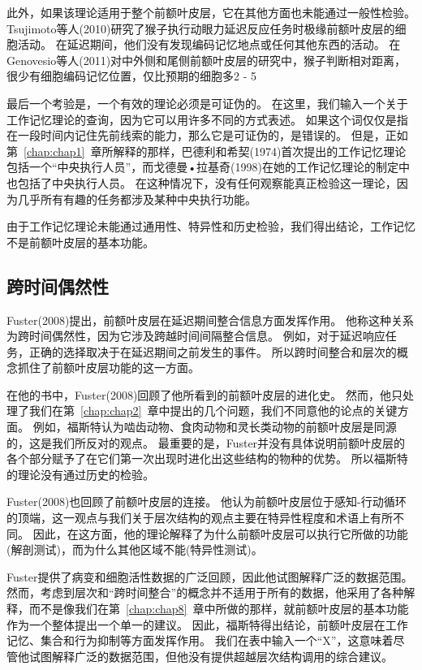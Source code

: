 此外，如果该理论适用于整个前额叶皮层，它在其他方面也未能通过一般性检验。
Tsujimoto等人(2010)研究了猴子执行动眼力延迟反应任务时极缘前额叶皮层的细胞活动。
在延迟期间，他们没有发现编码记忆地点或任何其他东西的活动。
在Genovesio等人(2011)对中外侧和尾侧前额叶皮层的研究中，猴子判断相对距离，很少有细胞编码记忆位置，仅比预期的细胞多2 - 5%
\par


最后一个考验是，一个有效的理论必须是可证伪的。
在这里，我们输入一个关于工作记忆理论的查询，因为它可以用许多不同的方式表述。
如果这个词仅仅是指在一段时间内记住先前线索的能力，那么它是可证伪的，是错误的。
但是，正如第~\ref{chap:chap1}~章所解释的那样，巴德利和希契(1974)首次提出的工作记忆理论包括一个“中央执行人员”，而戈德曼•拉基奇(1998)在她的工作记忆理论的制定中也包括了中央执行人员。
在这种情况下，没有任何观察能真正检验这一理论，因为几乎所有有趣的任务都涉及某种中央执行功能。
\par


由于工作记忆理论未能通过通用性、特异性和历史检验，我们得出结论，工作记忆不是前额叶皮层的基本功能。



\subsection{跨时间偶然性}

Fuster(2008)提出，前额叶皮层在延迟期间整合信息方面发挥作用。
他称这种关系为跨时间偶然性，因为它涉及跨越时间间隔整合信息。
例如，对于延迟响应任务，正确的选择取决于在延迟期间之前发生的事件。
所以跨时间整合和层次的概念抓住了前额叶皮层功能的这一方面。
\par


在他的书中，Fuster(2008)回顾了他所看到的前额叶皮层的进化史。
然而，他只处理了我们在第~\ref{chap:chap2}~章中提出的几个问题，我们不同意他的论点的关键方面。
例如，福斯特认为啮齿动物、食肉动物和灵长类动物的前额叶皮层是同源的，这是我们所反对的观点。
最重要的是，Fuster并没有具体说明前额叶皮层的各个部分赋予了在它们第一次出现时进化出这些结构的物种的优势。
所以福斯特的理论没有通过历史的检验。


\par 
Fuster(2008)也回顾了前额叶皮层的连接。
他认为前额叶皮层位于感知-行动循环的顶端，这一观点与我们关于层次结构的观点主要在特异性程度和术语上有所不同。
因此，在这方面，他的理论解释了为什么前额叶皮层可以执行它所做的功能(解剖测试)，而为什么其他区域不能(特异性测试)。
\par


Fuster提供了病变和细胞活性数据的广泛回顾，因此他试图解释广泛的数据范围。
然而，考虑到层次和“跨时间整合”的概念并不适用于所有的数据，他采用了各种解释，而不是像我们在第~\ref{chap:chap8}~章中所做的那样，就前额叶皮层的基本功能作为一个整体提出一个单一的建议。
因此，福斯特得出结论，前额叶皮层在工作记忆、集合和行为抑制等方面发挥作用。
我们在表中输入一个“X”，这意味着尽管他试图解释广泛的数据范围，但他没有提供超越层次结构调用的综合建议。


